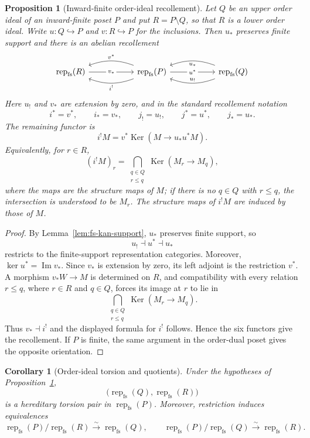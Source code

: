 \documentclass[10pt,a4paper]{amsart}
\newtheorem{proposition}[theorem]{Proposition}
\newtheorem{corollary}[theorem]{Corollary}
\newcommand{\Rep}{\operatorname{rep}}
\begin{document}
\begin{proposition}[Inward-finite order-ideal recollement]
\label{prop:fs-order-recollement}
Let $Q$ be an upper order ideal of an inward-finite poset $P$ and put
$R=P\setminus Q$, so that $R$ is a lower order ideal.  Write
$u:Q\hookrightarrow P$ and $v:R\hookrightarrow P$ for the inclusions.  Then
$u_*$ preserves finite support and there is an abelian recollement
\[
\begin{tikzcd}[column sep=5.5em]
\Rep_{\mathrm{fs}}(R)
  \arrow[r, "v_*" description]
& \Rep_{\mathrm{fs}}(P)
  \arrow[l, bend right=20, "v^*"']
  \arrow[l, bend left=20, "i^!"]
  \arrow[r, "u^*" description]
& \Rep_{\mathrm{fs}}(Q)
  \arrow[l, bend left=20, "u_!"']
  \arrow[l, bend right=20, "u_*"]
\end{tikzcd}
\]
Here $u_!$ and $v_*$ are extension by zero, and in the standard recollement
notation
\[
i^*=v^*,\qquad i_*=v_*,\qquad
j_!=u_!,\qquad j^*=u^*,\qquad j_*=u_*.
\]
The remaining functor is
\[
i^!M
=
v^*\operatorname{Ker}\!\left(M\longrightarrow u_*u^*M\right).
\]
Equivalently, for $r\in R$,
\[
(i^!M)_r
=
\bigcap_{\substack{q\in Q\\ r\le q}}
\operatorname{Ker}(M_r\longrightarrow M_q),
\]
where the maps are the structure maps of $M$; if there is no $q\in Q$ with
$r\le q$, the intersection is understood to be $M_r$.  The structure maps
of $i^!M$ are induced by those of $M$.


\end{proposition}

\begin{proof}
By Lemma~\ref{lem:fs-kan-support}, $u_*$ preserves finite support, so
\[
u_!\dashv u^*\dashv u_*
\]
restricts to the finite-support representation categories.  Moreover,
$\ker u^*=\operatorname{Im}v_*$.  Since $v_*$ is extension by zero, its
left adjoint is the restriction $v^*$.  A morphism $v_*W\to M$ is determined
on $R$, and compatibility with every relation $r\le q$, where $r\in R$ and
$q\in Q$, forces its image at $r$ to lie in
\[
\bigcap_{\substack{q\in Q\\ r\le q}}
\operatorname{Ker}(M_r\longrightarrow M_q).
\]
Thus $v_*\dashv i^!$ and the displayed formula for $i^!$ follows.  Hence the
six functors give the recollement.  If $P$ is finite, the same argument in the
order-dual poset gives the opposite orientation.
\end{proof}

\begin{corollary}[Order-ideal torsion and quotients]
\label{cor:order-ideal-consequences}
Under the hypotheses of Proposition~\ref{prop:fs-order-recollement},
\[
\bigl(\Rep_{\mathrm{fs}}(Q),\Rep_{\mathrm{fs}}(R)\bigr)
\]
is a hereditary torsion pair in $\Rep_{\mathrm{fs}}(P)$.  Moreover,
restriction induces equivalences
\[
\Rep_{\mathrm{fs}}(P)/\Rep_{\mathrm{fs}}(R)
\xrightarrow{\sim}\Rep_{\mathrm{fs}}(Q),
\qquad
\Rep_{\mathrm{fs}}(P)/\Rep_{\mathrm{fs}}(Q)
\xrightarrow{\sim}\Rep_{\mathrm{fs}}(R).
\]
\end{corollary}
\end{document}
